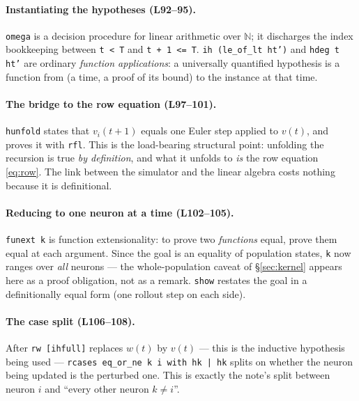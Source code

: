 \documentclass[11pt]{article}
\begin{document}
\paragraph{Instantiating the hypotheses (L92--95).} \texttt{omega} is a
decision procedure for linear arithmetic over $\mathbb N$; it discharges the
index bookkeeping between \texttt{t < T} and \texttt{t + 1 <= T}.
\texttt{ih (le\_of\_lt ht')} and \texttt{hdeg t ht'} are ordinary
\emph{function applications}: a universally quantified hypothesis is a
function from (a time, a proof of its bound) to the instance at that time.

\paragraph{The bridge to the row equation (L97--101).} \texttt{hunfold}
states that $v_i(t{+}1)$ equals one Euler step applied to $v(t)$, and proves
it with \texttt{rfl}. This is the load-bearing structural point: unfolding
the recursion is true \emph{by definition}, and what it unfolds to
\emph{is} the row equation \eqref{eq:row}. The link between the simulator and
the linear algebra costs nothing because it is definitional.

\paragraph{Reducing to one neuron at a time (L102--105).} \texttt{funext k}
is function extensionality: to prove two \emph{functions} equal, prove them
equal at each argument. Since the goal is an equality of population states,
\texttt{k} now ranges over \emph{all} neurons --- the whole-population
caveat of \S\ref{sec:kernel} appears here as a proof obligation, not as a
remark. \texttt{show} restates the goal in a definitionally equal form
(one rollout step on each side).

\paragraph{The case split (L106--108).} After \texttt{rw [ihfull]} replaces
$w(t)$ by $v(t)$ --- this is the inductive hypothesis being used ---
\texttt{rcases eq\_or\_ne k i with hk | hk} splits on whether the neuron
being updated is the perturbed one. This is exactly the note's split between
neuron $i$ and ``every other neuron $k\neq i$''.
\end{document}
